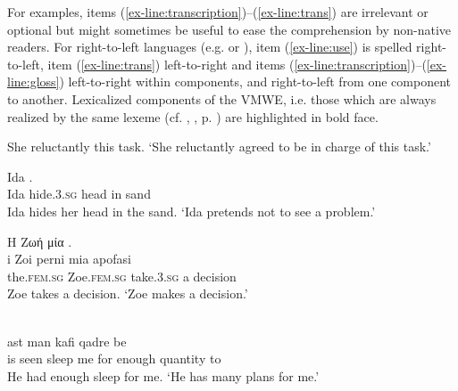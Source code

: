 \documentclass[output=paper,
modfonts,
]{langscibook}
\begin{document}
For  examples, items (\ref{ex-line:transcription})--(\ref{ex-line:trans}) are irrelevant or optional but  might sometimes be useful to ease the comprehension by non-native readers. For right-to-left languages (e.g.  or ), item (\ref{ex-line:use}) is spelled right-to-left, item (\ref{ex-line:trans}) left-to-right and items (\ref{ex-line:transcription})--(\ref{ex-line:gloss}) left-to-right within components, and right-to-left from one component to another. 
Lexicalized components of the VMWE, i.e. those which are always realized by the same lexeme %
(cf. , , p. \pageref{sec:def-scope}) 
are highlighted in bold face. 



\ea\label{preface:en:take-on}
\settowidth {} 
She reluctantly   this task. 
\glt `She reluctantly agreed to be in charge of this task.'
\z

\ea \label{preface:sl:skrivati-glavo-v-pesek}
\settowidth {} 
\gll Ida    . \\
Ida hide.\textsc{3.sg} head in sand \\ 
\glt Ida hides her head in the sand. `Ida pretends not to see a problem.’
\z

\ea \label{preface:el:take-decision}
\settowidth {} 
\glll Η Ζωή  μία . \\
i Zoi perni mia apofasi \\
the\textsc{.fem.sg} Zoe\textsc{.fem.sg} take.\textsc{3.sg} a decision \\ 
\glt Zoe takes a decision. `Zoe makes a decision.'
\z

\ea \label{preface:fa:have-sleep-for-sb}
\settowidth {} 
\glll {}        \\
ast   man  kafi qadre be  \\
is seen sleep me for enough quantity to\\ 
\glt He had enough sleep for me. `He has many plans for me.’
\z
\end{document}

